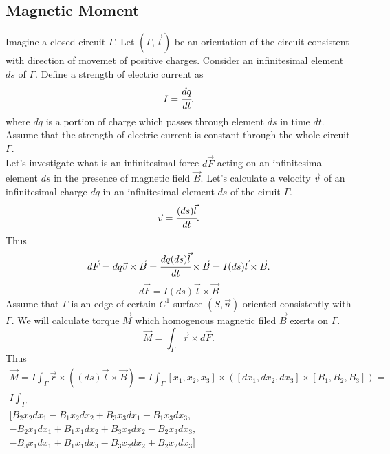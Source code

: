 \documentclass[main.tex]{subfiles}
\begin{document}
\subsection{Magnetic Moment}
\label{magnetic-moment}
Imagine a closed circuit $\Gamma$. Let $(\Gamma, \vec{l})$ be an orientation of the circuit consistent with direction of movemet of positive charges. Consider an infinitesimal element $ds$ of $\Gamma$.
Define a strength of electric current as
\begin{equation}
I = \cfrac{dq}{dt}.
\end{equation}
where $dq$ is a portion of charge which passes through element $ds$ in time $dt$.
Assume that the strength of electric current is constant through the whole circuit $\Gamma$.\\
Let's investigate what is an infinitesimal force $d\vec{F}$ acting on an infinitesimal element $ds$ in the presence of magnetic field $\vec{B}$. Let's calculate a velocity $\vec{v}$ of an infinitesimal charge $dq$ in an infinitesimal element $ds$ of the ciruit $\Gamma$.
\begin{equation}
\vec{v} = \cfrac{(ds)\vec{l}}{dt}.
\end{equation} 
Thus
\begin{equation}
d\vec{F} = dq \vec{v} \times \vec{B} = \cfrac{dq(ds)\vec{l}}{dt} \times \vec{B} = I(ds)\vec{l}\times \vec{B}.
\end{equation}
\begin{equation}
\label{partial-force-in-magnetic}
\boxed{d\vec{F} = I(ds)\vec{l}\times \vec{B}}
\end{equation}
Assume that $\Gamma$ is an edge of certain $C^1$ surface $(S, \vec{n})$ oriented consistently with $\Gamma$. We will calculate torque $\vec{M}$ which homogenous magnetic filed $\vec{B}$ exerts on $\Gamma$.
\begin{equation}
\vec{M} = \int_\Gamma \vec{r}\times d\vec{F}.
\end{equation}
Thus
\begin{multline} 
\vec{M} = I \int_\Gamma \vec{r}\times ((ds)\vec{l}\times \vec{B}) = I\int_\Gamma [x_1,x_2,x_3]\times([dx_1,dx_2,dx_3]\times[B_1,B_2,B_3])= \\
I\int_\Gamma \\
[B_2 x_2 dx_1 -B_1 x_2dx_2 +B_3 x_3 dx_1 -B_1 x_3 dx_3, \\
-B_2 x_1 dx_1 +B_1 x_1 dx_2 + B_3 x_3 dx_2 -B_2 x_3 dx_3 ,\\
-B_3 x_1 dx_1 +B_1 x_1 dx_3 -B_3
   x_2 dx_2 +B_2 x_2 dx_3 ]\\
\end{multline}
\end{document}
